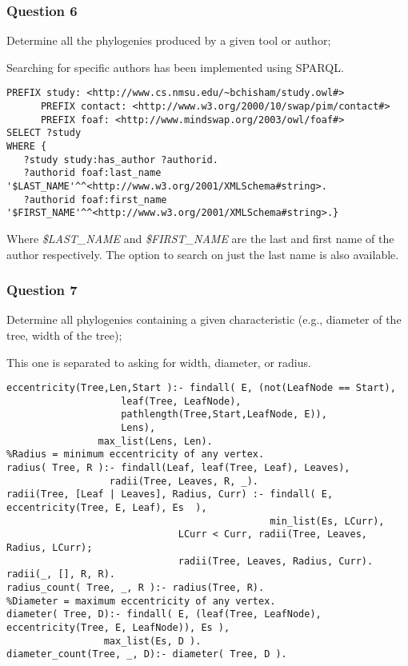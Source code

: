 \documentclass[10pt]{article}
\begin{document}
\subsubsection{Question 6}
 Determine all the phylogenies produced by a given tool or author;

Searching for specific authors has been implemented using SPARQL.

\begin{verbatim}
PREFIX study: <http://www.cs.nmsu.edu/~bchisham/study.owl#>
      PREFIX contact: <http://www.w3.org/2000/10/swap/pim/contact#>
      PREFIX foaf: <http://www.mindswap.org/2003/owl/foaf#>
SELECT ?study
WHERE {
   ?study study:has_author ?authorid.
   ?authorid foaf:last_name '$LAST_NAME'^^<http://www.w3.org/2001/XMLSchema#string>.
   ?authorid foaf:first_name '$FIRST_NAME'^^<http://www.w3.org/2001/XMLSchema#string>.}
\end{verbatim}

Where \emph{\$LAST\_NAME} and \emph{\$FIRST\_NAME} are the last and first name of the author respectively.  The option to search on just the last name is also available.

\subsubsection{Question 7}
Determine all phylogenies containing a given characteristic (e.g., diameter of the tree, width of the tree);

This one is separated to asking for width, diameter, or radius.
\begin{verbatim}
eccentricity(Tree,Len,Start ):- findall( E, (not(LeafNode == Start),
					leaf(Tree, LeafNode), 
					pathlength(Tree,Start,LeafNode, E)), 
					Lens),
				max_list(Lens, Len).
%Radius = minimum eccentricity of any vertex.
radius( Tree, R ):- findall(Leaf, leaf(Tree, Leaf), Leaves),
	       	      radii(Tree, Leaves, R, _).
radii(Tree, [Leaf | Leaves], Radius, Curr) :- findall( E, eccentricity(Tree, E, Leaf), Es  ),
	                           		          min_list(Es, LCurr),
					          LCurr < Curr, radii(Tree, Leaves, Radius, LCurr);
					          radii(Tree, Leaves, Radius, Curr).
radii(_, [], R, R).
radius_count( Tree, _, R ):- radius(Tree, R).
%Diameter = maximum eccentricity of any vertex.
diameter( Tree, D):- findall( E, (leaf(Tree, LeafNode), eccentricity(Tree, E, LeafNode)), Es ), 
		         max_list(Es, D ).
diameter_count(Tree, _, D):- diameter( Tree, D ).
\end{verbatim}
\end{document}
